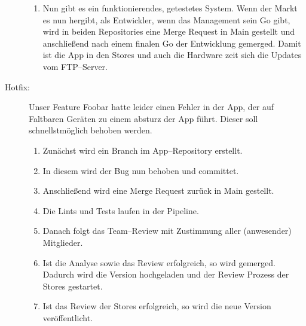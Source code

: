 \begin{description}
\begin{enumerate}
                \item Nun gibt es ein funktionierendes, getestetes System.
                    Wenn der Markt es nun hergibt, als Entwickler, wenn das Management sein Go gibt, wird in beiden Repositories eine Merge Request in Main gestellt und anschließend nach einem finalen Go der Entwicklung gemerged.
                    Damit ist die App in den Stores und auch die Hardware zeit sich die Updates vom FTP--Server.
            \end{enumerate}
        \item[Hotfix:] Unser Feature Foobar hatte leider einen Fehler in der App, der auf Faltbaren Geräten zu einem absturz der App führt.
            Dieser soll schnellstmöglich behoben werden.
            \begin{enumerate}
                \item Zunächst wird ein Branch  im App--Repository erstellt.
                \item In diesem wird der Bug nun behoben und committet.
                \item Anschließend wird eine Merge Request zurück in Main gestellt.
                \item Die Lints und Tests laufen in der Pipeline.
                \item Danach folgt das Team--Review mit Zustimmung aller (anwesender) Mitglieder.
                \item Ist die Analyse sowie das Review erfolgreich, so wird gemerged.
                    Dadurch wird die Version hochgeladen und der Review Prozess der Stores gestartet.
                \item Ist das Review der Stores erfolgreich, so wird die neue Version veröffentlicht.
            \end{enumerate}
    \end{description}

